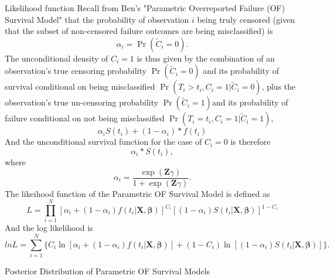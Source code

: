 \documentclass[a4paper, 12pt]{article}
\makeatletter
\newcommand {\dsum}{\displaystyle \sum}
\newcommand {\dprod}{\displaystyle \prod}
\renewcommand{\section}{\@startsection
	{section}    {1}    {0mm}    {-0.7\baselineskip}    {0.08\baselineskip}    {\normalfont\large\sc\center\bf}}
\renewcommand{\subsection}{\@startsection
	{subsection}    {2}    {0mm}    {-0.5\baselineskip}    {0.01\baselineskip}    {\normalfont\normalsize\itshape\center}}
\makeatother
\begin{document}
\subsection{Likelihood function}
\noindent Recall from Ben's "Parametric Overreported Failure (OF) Survival Model" that the
probability of observation $i$ being truly censored (given that the subset of non-censored failure
outcomes are being misclassified) is%
\begin{equation}
\alpha_i =\Pr (\widetilde{C}_{i}=0).
\end{equation}
The unconditional density of $C_i = 1$ is thus given by the combination of an
observation's true censoring probability $\Pr (\widetilde{C}_{i}=0)$ and its probability of
survival conditional on being misclassified $\Pr (T_i > t_i , C_i =1 |\widetilde{C}_{i}=0)$, plus the observation's true un-censoring probability $\Pr (\widetilde{C}_{i}=1)$and its probability of failure conditional on not being misclassified $\Pr (T_i =t_i , C_i =1 |\widetilde{C}_{i}=1)$,%
\begin{equation}
\alpha _{i}S(t_i)+(1-\alpha _{i})\ast f(t_{i})
\end{equation}
And the unconditional survival function for the case of $C_i = 0$ is therefore%
\begin{equation}
\alpha _{i}\ast S(t_{i}),
\end{equation}
where
\begin{equation}
\alpha _{i}=\frac{\exp (\mathbf{Z}\gamma )}{1+\exp (\mathbf{Z}\gamma )}.
\end{equation}
The likeihood function of the Parametric OF Survival Model is defined as 
\begin{equation}
L=\dprod\limits_{i=1}^{N}[\alpha _{i}+(1-\alpha _{i})f(t_{i}|\mathbf{X},\mathbf{\beta}
)]^{C_{i}}[(1-\alpha _{i})S(t_{i}|\mathbf{X,}\mathbf{\beta})]^{1-C_{i}}
\end{equation}
And the log likelihood is%
\begin{equation}
lnL=\dsum\limits_{i=1}^{N}\{C_{i}\ln [\alpha _{i}+(1-\alpha
_{i})f(t_{i}|\mathbf{X},\mathbf{\beta})]+(1-C_{i})\ln [(1-\alpha _{i})S(t_{i}|\mathbf{X,}%
\mathbf{\beta})]\}.
\end{equation}
\section{Posterior Distribution of Parametric OF Survival Models}
\iffalse\noindent The parametric survival models, also known as accelerated failure time models (AFT models), includes exponential, log-normal, log-logistic, and Weibull distributions. Although the classical approach is the maximum likelihood for parameter estimation, here we use Bayesian analysis to model Exponential and Weibull cases.\fi
\end{document}
